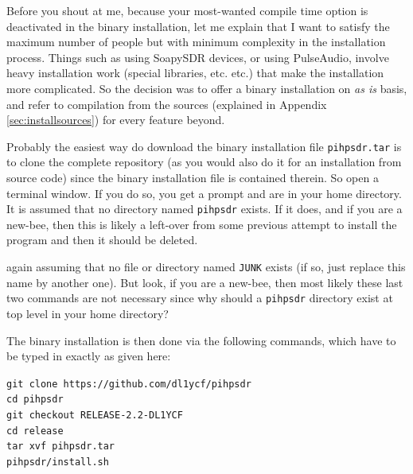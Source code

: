 \documentclass[12pt]{book}
\def\grtt#1{\texttt{\color{magenta}#1}}
\begin{document}
Before you shout at me, because your most-wanted compile time option is deactivated in the
binary installation, let me explain that I want to satisfy the maximum number of people but
with minimum complexity in the installation process. Things such as using SoapySDR devices,
or using PulseAudio, involve heavy installation work (special libraries, etc. etc.) that make
the installation more complicated. So the decision was to offer a binary installation on
\textit{as is} basis, and refer to compilation from the sources
 (explained in Appendix \ref{sec:installsources})
for every feature beyond.

\begin{center}
\end{center}
Probably the easiest way do download the binary installation file \texttt{pihpsdr.tar} is to clone
the complete repository (as you would also do it for an installation from source code) since the
binary installation file is contained therein. So open a terminal window. If you do so, you get
a prompt and are in your home directory. It is assumed that no directory named \texttt{pihpsdr}
exists. If it does, and if you are a new-bee, then this is likely a left-over from some previous
attempt to install the program and then it should be deleted.

again assuming that no file or directory named \texttt{JUNK} exists (if so, just replace this
name by another one). But look, if you are a new-bee, then most likely these last two commands
are not necessary since why should a \texttt{pihpsdr} directory exist at top level in your
home directory?

The binary installation
is then done via the following commands, which have to be typed in exactly as given here:

\grtt{git clone https://github.com/dl1ycf/pihpsdr} \\
\grtt{cd pihpsdr} \\
\grtt{git checkout RELEASE-2.2-DL1YCF} \\
\grtt{cd release} \\
\grtt{tar xvf pihpsdr.tar} \\
\grtt{pihpsdr/install.sh} \\
\end{document}
